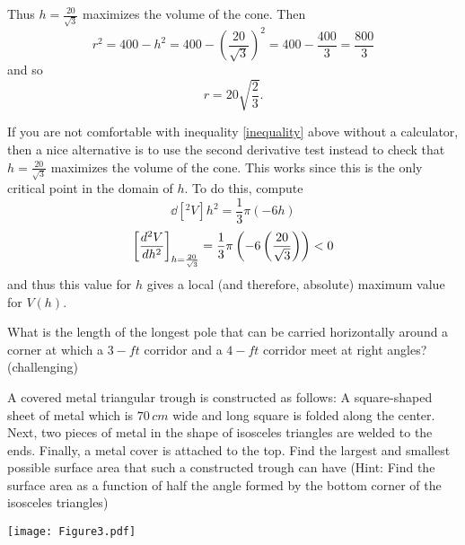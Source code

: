 \documentclass[nooutcomes]{ximera}
\begin{document}
\begin{problem}
\begin{freeResponse}
		Thus $h=\frac{20}{\sqrt{3}}$ maximizes the volume of the cone.  Then 
		$$r^2 = 400 - h^2 = 400 - \left( \frac{20}{\sqrt{3}} \right)^2 = 400 - \frac{400}{3} = \frac{800}{3}$$
		and so
		$$ r = 20 \sqrt{\frac{2}{3}}. $$
		
		If you are not comfortable with inequality \eqref{inequality} above without a calculator, then a nice alternative is to use the second derivative test instead to check that $h=\frac{20}{\sqrt{3}}$ maximizes the volume of the cone.  This works since this is the only critical point in the domain of $h$.  To do this, compute
		$$ \dd[^2V]{h^2} = \frac{1}{3} \pi (-6h) $$
		$$ \eval{\dd[^2V]{h^2}}_{h=\frac{20}{\sqrt{3}}} = \frac{1}{3} \pi \left( -6 \left(\frac{20}{\sqrt{3}} \right) \right) < 0 $$
		and thus this value for $h$ gives a local (and therefore, absolute) maximum value for $V(h)$.  
		
		\end{freeResponse}
		
		
		

\end{problem}
	
	
	
	
	
\begin{center}		\end{center}
	
			
			

\begin{problem}
What is the length of the longest pole that can be carried horizontally around a corner at which a $3-ft$ corridor and a $4-ft$ corridor meet at right angles? (challenging)
\end{problem}



\begin{problem}
A covered metal triangular trough is constructed as follows:  A square-shaped sheet of metal which is $70 \, cm$ wide and long square is folded along the center.  Next, two pieces of metal in the shape of isosceles triangles are welded to the ends.  Finally, a metal cover is attached to the top.  Find the largest and smallest possible surface area that such a constructed trough can have (Hint:  Find the surface area as a function of half the angle formed by the bottom corner of the isosceles triangles)

		\begin{image}
		\texttt{[image: Figure3.pdf]}
		\end{image}
\end{problem}
\end{document}
